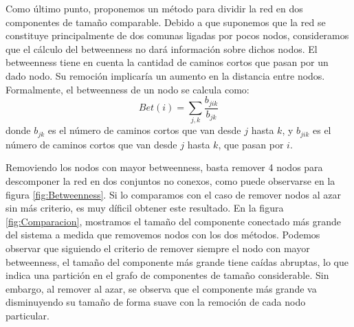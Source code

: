 \par Como último punto, proponemos un método para dividir la red en dos componentes de tamaño comparable. Debido a que suponemos que la red se constituye principalmente de dos comunas ligadas por pocos nodos, consideramos que el cálculo del betweenness no dará información sobre dichos nodos. El betweenness tiene en cuenta la cantidad de caminos cortos que pasan por un dado nodo. Su remoción implicaría un aumento en la distancia entre nodos. Formalmente, el betweenness de un nodo se calcula como:
\begin{equation}
	Bet(i) = \sum_{j,k} \frac{b_{jik}}{b_{jk}}
\end{equation}
donde $b_{jk}$ es el número de caminos cortos que van desde $j$ hasta $k$, y $b_{jik}$ es el número de caminos cortos que van desde $j$ hasta $k$, que pasan por $i$.
\par Removiendo los nodos con mayor betweenness, basta remover 4 nodos para descomponer la red en dos conjuntos no conexos, como puede observarse en la figura \ref{fig:Betweenness}. Si lo comparamos con el caso de remover nodos al azar sin más criterio, es muy díficil obtener este resultado. En la figura \ref{fig:Comparacion}, mostramos el tamaño del componente conectado más grande del sistema a medida que removemos nodos con los dos métodos. Podemos observar que siguiendo el criterio de remover siempre el nodo con mayor betweenness, el tamaño del componente más grande tiene caídas abruptas, lo que indica una partición en el grafo de componentes de tamaño considerable. Sin embargo, al remover al azar, se observa que el componente más grande va disminuyendo su tamaño de forma suave con la remoción de cada nodo particular. 

